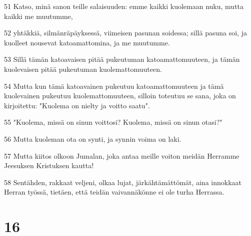 \par 51 Katso, minä sanon teille salaisuuden: emme kaikki kuolemaan nuku, mutta kaikki me muutumme,
\par 52 yhtäkkiä, silmänräpäyksessä, viimeisen pasunan soidessa; sillä pasuna soi, ja kuolleet nousevat katoamattomina, ja me muutumme.
\par 53 Sillä tämän katoavaisen pitää pukeutuman katoamattomuuteen, ja tämän kuolevaisen pitää pukeutuman kuolemattomuuteen.
\par 54 Mutta kun tämä katoavainen pukeutuu katoamattomuuteen ja tämä kuolevainen pukeutuu kuolemattomuuteen, silloin toteutuu se sana, joka on kirjoitettu: "Kuolema on nielty ja voitto saatu".
\par 55 "Kuolema, missä on sinun voittosi? Kuolema, missä on sinun otasi?"
\par 56 Mutta kuoleman ota on synti, ja synnin voima on laki.
\par 57 Mutta kiitos olkoon Jumalan, joka antaa meille voiton meidän Herramme Jeesuksen Kristuksen kautta!
\par 58 Sentähden, rakkaat veljeni, olkaa lujat, järkähtämättömät, aina innokkaat Herran työssä, tietäen, että teidän vaivannäkönne ei ole turha Herrassa.

\chapter{16}

